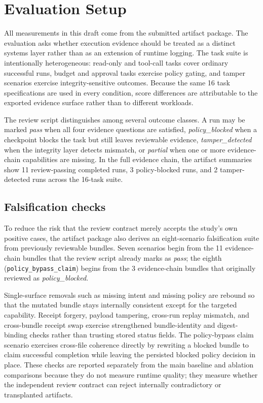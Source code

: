 \section{Evaluation Setup}
\label{sec:evaluation}

All measurements in this draft come from the submitted artifact package. The evaluation asks whether execution evidence should be treated as a distinct systems layer rather than as an extension of runtime logging. The task suite is intentionally heterogeneous: read-only and tool-call tasks cover ordinary successful runs, budget and approval tasks exercise policy gating, and tamper scenarios exercise integrity-sensitive outcomes. Because the same 16 task specifications are used in every condition, score differences are attributable to the exported evidence surface rather than to different workloads.

The review script distinguishes among several outcome classes. A run may be marked \emph{pass} when all four evidence questions are satisfied, \emph{policy\_blocked} when a checkpoint blocks the task but still leaves reviewable evidence, \emph{tamper\_detected} when the integrity layer detects mismatch, or \emph{partial} when one or more evidence-chain capabilities are missing. In the full evidence chain, the artifact summaries show 11 review-passing completed runs, 3 policy-blocked runs, and 2 tamper-detected runs across the 16-task suite.

\subsection{Falsification checks}

To reduce the risk that the review contract merely accepts the study's own positive cases, the artifact package also derives an eight-scenario falsification suite from previously reviewable bundles. Seven scenarios begin from the 11 evidence-chain bundles that the review script already marks as \emph{pass}; the eighth (\texttt{policy\_bypass\_claim}) begins from the 3 evidence-chain bundles that originally reviewed as \emph{policy\_blocked}.

Single-surface removals such as missing intent and missing policy are rebound so that the mutated bundle stays internally consistent except for the targeted capability. Receipt forgery, payload tampering, cross-run replay mismatch, and cross-bundle receipt swap exercise strengthened bundle-identity and digest-binding checks rather than trusting stored status fields. The policy-bypass claim scenario exercises cross-file coherence directly by rewriting a blocked bundle to claim successful completion while leaving the persisted blocked policy decision in place. These checks are reported separately from the main baseline and ablation comparisons because they do not measure runtime quality; they measure whether the independent review contract can reject internally contradictory or transplanted artifacts.
